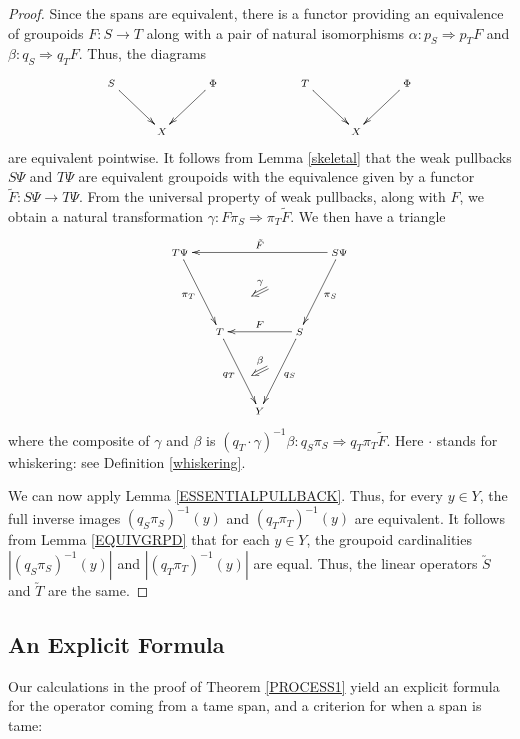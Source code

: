 \documentclass{article}
\renewcommand{\to}{\rightarrow}
\newcommand{\maps}{\colon}
\begin{document}
\begin{proof}
Since the spans are equivalent, there is a functor providing an
equivalence of groupoids $F \maps S \to T$ along with a pair of
natural isomorphisms $\alpha \maps p_S \Rightarrow p_TF$ and 
$\beta \maps q_S \Rightarrow q_TF$.  Thus, the diagrams
\[
\xymatrix{
S \ar[dr] && \Phi \ar[dl] & & T \ar[dr] && \Phi \ar[dl] \\
& X & && & X &
}
\]
are equivalent pointwise.  It follows from Lemma \ref{skeletal} that
the weak pullbacks $S\Psi$ and $T\Psi$ are equivalent groupoids with
the equivalence given by a functor $\tilde{F} \maps S\Psi \to T\Psi$.
From the universal property of weak pullbacks, along with $F$, we
obtain a natural transformation $\gamma \maps F\pi_S \Rightarrow
\pi_T\tilde{F}$.  We then have a triangle
\[ \def\objectstyle{\scriptstyle}
  \def\labelstyle{\scriptstyle}
   \xy
   (20,20)*+{S\Psi}="1";
   (-20,20)*+{T\Psi}="2";
   (10,0)*+{S}="3";
   (-10,0)*+{T}="4";
   (0,-20)*+{Y}="5";
        {\ar_{\tilde{F}} "1";"2"};
        {\ar^{\pi_S} "1";"3"};
        {\ar_{\pi_T} "2";"4"};
        {\ar^{q_S} "3";"5"};
        {\ar_{q_T} "4";"5"};
        {\ar_{F} "3";"4"};
        {\ar@{=>}_<<{\scriptstyle \gamma} (2,11); (-2,9)};
        {\ar@{=>}_<<{\scriptstyle \beta} (2,-9); (-2,-11)};

\endxy
\]
where the composite of $\gamma$ and $\beta$ is $(q_T \cdot
\gamma)^{-1}\beta \maps q_S \pi_S \Rightarrow q_T\pi_T\tilde{F}$.
Here $\cdot$ stands for whiskering: see Definition \ref{whiskering}.

We can now apply Lemma \ref{ESSENTIALPULLBACK}.  Thus, for every $y \in
Y$, the full inverse images $(q_S\pi_S)^{-1}(y)$ and
$(q_T\pi_T)^{-1}(y)$ are equivalent.  It follows from Lemma
\ref{EQUIVGRPD} that for each $y \in Y$, the groupoid cardinalities
$|(q_S\pi_S)^{-1}(y)|$ and $|(q_T\pi_T)^{-1}(y)|$ are equal.  Thus,
the linear operators $\utilde{S}$ and $\utilde{T}$ are the same.
\end{proof}

\subsection{An Explicit Formula}
\label{explicit}

Our calculations in the proof of Theorem \ref{PROCESS1} yield an explicit
formula for the operator coming from a tame span, and a criterion for
when a span is tame:
\end{document}
